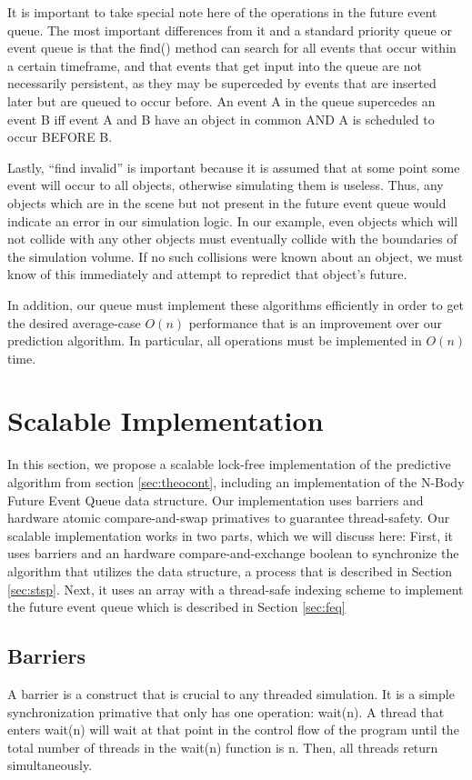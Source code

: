 \documentclass[conference]{IEEEtran}
\begin{document}
It is important to take special note here of the operations in the future event queue.  The most important differences from it and a standard priority queue or event queue
is that the find() method can search for all events that occur within a certain timeframe, and that events that get input into the queue are not necessarily persistent, as they 
may be superceded by events that are inserted later but are queued to occur before.  An event A in the queue supercedes an event B iff event A and B have an object in common AND A is scheduled to occur BEFORE B.

Lastly, ``find invalid'' is important because it is assumed that at some point some event will occur to all objects, otherwise simulating them is 
useless.  Thus, any objects which are in the scene but not present in the future event queue would indicate an error in our simulation logic.  In our example, even objects which
will not collide with any other objects must eventually collide with the boundaries of the simulation volume.  If no such collisions were known about
an object, we must know of this immediately and attempt to repredict that object's future.

In addition, our queue must implement these algorithms efficiently in order to get the desired average-case $O(n)$ performance that is an improvement over our prediction algorithm.  In particular, all operations must be implemented in $O(n)$ time.

\section{Scalable Implementation}
In this section, we propose a scalable lock-free implementation of the predictive algorithm from section \ref{sec:theocont}, including an implementation of the 
N-Body Future Event Queue data structure.  Our implementation uses barriers and hardware atomic compare-and-swap primatives to guarantee thread-safety.  Our scalable implementation
works in two parts, which we will discuss here:  First, it uses barriers and an hardware compare-and-exchange boolean to synchronize the algorithm that utilizes the data structure, 
a process that is described in Section \ref{sec:stsp}.  Next, it uses an array with a thread-safe indexing scheme to implement the future event queue which is described in Section \ref{sec:feq}
\subsection{Barriers}
\label{sec:barrier}
A barrier is a construct that is crucial to any threaded simulation.  It is a simple synchronization primative that only has one operation: wait(n).  
A thread that enters wait(n) will wait at that point in the control flow of the program until the total number of threads in the wait(n) function is n.  Then,
all threads return simultaneously.
\end{document}
